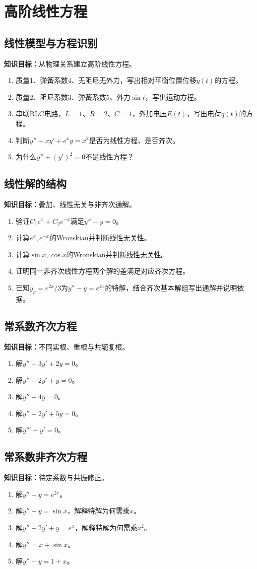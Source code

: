 \documentclass[11pt,a4paper,fontset=fandol]{ctexrep}
\newcommand{\goal}[1]{\textbf{知识目标：}#1\par}
\begin{document}
\section{高阶线性方程}
\subsection{线性模型与方程识别}
\goal{从物理关系建立高阶线性方程。}
\begin{enumerate}
\item 质量1、弹簧系数4、无阻尼无外力，写出相对平衡位置位移$y(t)$的方程。
\item 质量2、阻尼系数3、弹簧系数5、外力$\sin t$，写出运动方程。
\item 串联RLC电路，$L=1$、$R=2$、$C=1$，外加电压$E(t)$，写出电荷$q(t)$的方程。
\item 判断$y''+xy'+e^xy=x^2$是否为线性方程、是否齐次。
\item 为什么$y''+(y')^2=0$不是线性方程？
\end{enumerate}
\subsection{线性解的结构}
\goal{叠加、线性无关与非齐次通解。}
\begin{enumerate}
\item 验证$C_1e^x+C_2e^{-x}$满足$y''-y=0$。
\item 计算$e^x,e^{-x}$的Wronskian并判断线性无关性。
\item 计算$\sin x,\cos x$的Wronskian并判断线性无关性。
\item 证明同一非齐次线性方程两个解的差满足对应齐次方程。
\item 已知$y_p=e^{2x}/3$为$y''-y=e^{2x}$的特解，结合齐次基本解组写出通解并说明依据。
\end{enumerate}
\subsection{常系数齐次方程}
\goal{不同实根、重根与共轭复根。}
\begin{enumerate}
\item 解$y''-3y'+2y=0$。
\item 解$y''-2y'+y=0$。
\item 解$y''+4y=0$。
\item 解$y''+2y'+5y=0$。
\item 解$y'''-y'=0$。
\end{enumerate}
\subsection{常系数非齐次方程}
\goal{待定系数与共振修正。}
\begin{enumerate}
\item 解$y''-y=e^{2x}$。
\item 解$y''+y=\sin x$，解释特解为何需乘$x$。
\item 解$y''-2y'+y=e^x$，解释特解为何需乘$x^2$。
\item 解$y''=x+\sin x$。
\item 解$y''+y=1+x$。
\end{enumerate}
\end{document}
